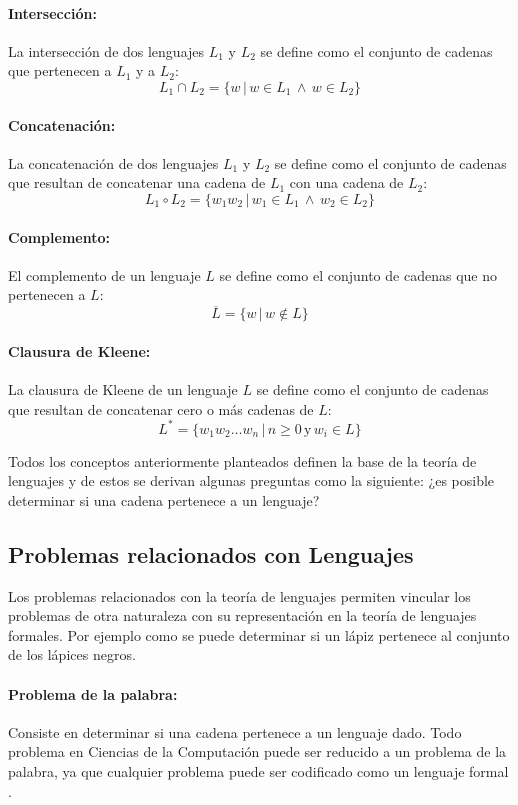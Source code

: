 \documentclass[12pt]{article}
\begin{document}
\paragraph{Intersección:} La intersección de dos lenguajes $L_1$ y $L_2$ se define como el conjunto de
cadenas que pertenecen a $L_1$ y a $L_2$:
$$L_1\cap L_2=\{w\,|\,w\in L_1\,\wedge\,w\in L_2\}$$
\paragraph{Concatenación:} La concatenación de dos lenguajes $L_1$ y $L_2$ se define como el conjunto
de cadenas que resultan de concatenar una cadena de $L_1$ con una cadena de $L_2$:
$$L_1\circ L_2=\{w_1w_2\,|\,w_1\in L_1\,\wedge\,w_2\in L_2\}$$
\paragraph{Complemento:} El complemento de un lenguaje $L$ se define como el conjunto de cadenas que no
pertenecen a $L$:
$$\overline{L}=\{w\,|\,w\notin L\}$$
\paragraph{Clausura de Kleene:} La clausura de Kleene de un lenguaje $L$ se define como el conjunto de
cadenas que resultan de concatenar cero o más cadenas de $L$:
$$L^*=\{w_1w_2\ldots w_n\,|\,n\geq 0\,\text{y}\,w_i\in L\}$$

Todos los conceptos anteriormente planteados definen la base de la teoría de lenguajes y de estos se derivan algunas 
preguntas como la siguiente: ¿es posible determinar si una cadena pertenece a un lenguaje?

\subsection{Problemas relacionados con Lenguajes}

Los problemas relacionados con la teoría de lenguajes permiten vincular los problemas de otra naturaleza 
con su representación en la teoría de lenguajes formales. Por ejemplo como se puede determinar si un lápiz 
pertenece al conjunto de los lápices negros.

\paragraph{Problema de la palabra:} Consiste en determinar si una cadena pertenece a un lenguaje dado. Todo problema en Ciencias de la Computación puede ser reducido a un problema de la palabra, ya que cualquier problema
puede ser codificado como un lenguaje formal \cite{authomataTheory}.
\end{document}
